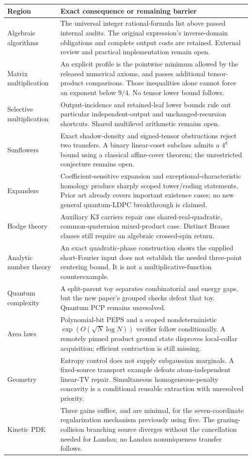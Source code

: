 \documentclass[11pt]{article}
\begin{document}
\begin{longtable}{p{.20\linewidth}p{.73\linewidth}}
\toprule Region & Exact consequence or remaining barrier\\\midrule
Algebraic algorithms & The universal integer rational-formula list above passed internal audits. The original expression's inverse-domain obligations and complete output costs are retained. External review and practical implementation remain open.\\
Matrix multiplication & An explicit profile is the pointwise minimum allowed by the released numerical axioms, and passes additional tensor-product comparisons. Those inequalities alone cannot force an exponent below $9/4$. No tensor lower bound follows.\\
Selective multiplication & Output-incidence and retained-leaf lower bounds rule out particular independent-output and unchanged-recursion shortcuts. Shared multilevel arithmetic remains open.\\
Sunflowers & Exact shadow-density and signed-tensor obstructions reject two transfers. A binary linear-coset subclass admits a $4^k$ bound using a classical affine-cover theorem; the unrestricted conjecture remains open.\\
Expanders & Coefficient-sensitive expansion and exceptional-characteristic homology produce sharply scoped tower/coding statements. Prior art already covers important existence cases; no new general quantum-LDPC breakthrough is claimed.\\
Hodge theory & Auxiliary K3 carriers repair one shared-real-quadratic, common-quaternion mixed-product case. Distinct Brauer classes still require an algebraic crossed-spin return.\\
Analytic number theory & An exact quadratic-phase construction shows the supplied short-Fourier input does not establish the needed three-point centering bound. It is not a multiplicative-function counterexample.\\
Quantum complexity & A split-parent toy separates combinatorial and energy gaps, but the new paper's grouped checks defeat that toy. Quantum PCP remains unresolved.\\
Area laws & Polynomial-bit PEPS and a scoped nondeterministic $\exp(O(\sqrt N\log N))$ verifier follow conditionally. A remotely pinned product ground state disproves local-collar acquisition; efficient contraction is still missing.\\
Geometry & Entropy control does not supply subgaussian marginals. A fixed-source transport example defeats atom-independent linear-TV repair. Simultaneous homogeneous-penalty concavity is a conditional reusable extraction with unresolved priority.\\
Kinetic PDE & Three gains suffice, and are minimal, for the seven-coordinate regularization mechanism previously using five. The grazing-collision branching source diverges without the cancellation needed for Landau; no Landau nonuniqueness transfer follows.\\
\bottomrule
\end{longtable}
\end{document}
